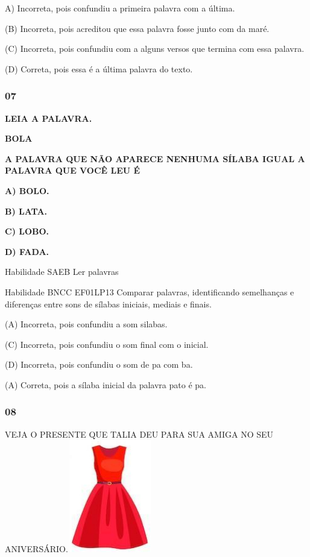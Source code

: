 A) Incorreta, pois confundiu a primeira palavra com a última.

(B) Incorreta, pois acreditou que essa palavra fosse junto com da maré.

(C) Incorreta, pois confundiu com a alguns versos que termina com essa
palavra.

(D) Correta, pois essa é a última palavra do texto.

\subsubsection{07}\label{section-63}

\textbf{LEIA A PALAVRA.}

\textbf{BOLA}

\textbf{A PALAVRA QUE NÃO APARECE NENHUMA SÍLABA IGUAL A PALAVRA QUE
VOCÊ LEU É}

\textbf{A) BOLO.}

\textbf{B) LATA.}

\textbf{C) LOBO.}

\textbf{D) FADA.}

Habilidade SAEB Ler palavras

Habilidade BNCC EF01LP13 Comparar palavras, identificando semelhanças e
diferenças entre sons de sílabas iniciais, mediais e finais.

(A) Incorreta, pois confundiu a som silabas.

(C) Incorreta, pois confundiu o som final com o inicial.

(D) Incorreta, pois confundiu o som de pa com ba.

(A) Correta, pois a sílaba inicial da palavra pato é
pa.\protect\hypertarget{_heading=h.7lb9brf4wytg}{}{}

\subsubsection{08 }\label{section-64}

VEJA O PRESENTE QUE TALIA DEU PARA SUA AMIGA NO SEU
ANIVERSÁRIO.\includegraphics[width=1.45972in,height=1.93403in]{media/image232.jpg}

